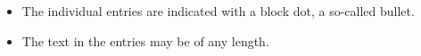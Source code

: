 \documentclass{article}
\begin{document}
\begin{itemize}
    \item The individual entries are indicated with a block dot, a so-called bullet.
    \item The text in the entries may be of any length.
\end{itemize}
\end{document}
